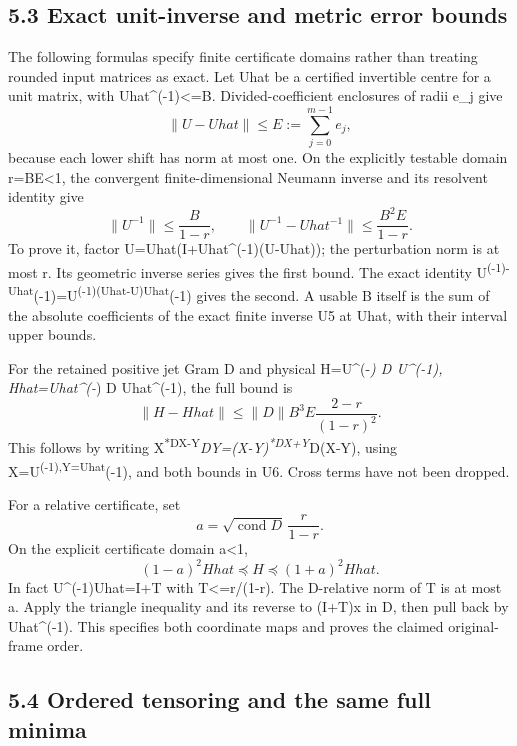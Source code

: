 \subsection{5.3 Exact unit-inverse and metric error bounds}\label{exact-unit-inverse-and-metric-error-bounds}

The following formulas specify finite certificate domains rather than treating rounded input matrices as exact. Let Uhat be a certified invertible centre for a unit matrix, with \textbar\textbar Uhat\^{}(-1)\textbar\textbar\textless=B. Divided-coefficient enclosures of radii e\_j give \[
 \|U-Uhat\|\le E:=\sum_{j=0}^{m-1}e_j,
\] because each lower shift has norm at most one. On the explicitly testable domain r=BE\textless1, the convergent finite-dimensional Neumann inverse and its resolvent identity give \[
 \boxed{\|U^{-1}\|\le\frac{B}{1-r},\qquad
 \|U^{-1}-Uhat^{-1}\|\le\frac{B^2E}{1-r}.}\tag{U6}
\] To prove it, factor U=Uhat(I+Uhat\^{}(-1)(U-Uhat)); the perturbation norm is at most r. Its geometric inverse series gives the first bound. The exact identity U\textsuperscript{(-1)-Uhat}(-1)=U\textsuperscript{(-1)(Uhat-U)Uhat}(-1) gives the second. A usable B itself is the sum of the absolute coefficients of the exact finite inverse U5 at Uhat, with their interval upper bounds.

For the retained positive jet Gram D and physical H=U\^{}(-\emph{) D U\^{}(-1), Hhat=Uhat\^{}(-}) D Uhat\^{}(-1), the full bound is \[
 \boxed{\|H-Hhat\|
 \le\|D\|B^3E\frac{2-r}{(1-r)^2}.}\tag{U7}
\] This follows by writing X\textsuperscript{*DX-Y}\emph{DY=(X-Y)\textsuperscript{*DX+Y}}D(X-Y), using X=U\textsuperscript{(-1),Y=Uhat}(-1), and both bounds in U6. Cross terms have not been dropped.

For a relative certificate, set \[
 a=\sqrt{\operatorname{cond}D}\,\frac{r}{1-r}.
\] On the explicit certificate domain a\textless1, \[
 \boxed{(1-a)^2Hhat\preceq H\preceq(1+a)^2Hhat.}\tag{U8}
\] In fact U\^{}(-1)Uhat=I+T with \textbar\textbar T\textbar\textbar\textless=r/(1-r). The D-relative norm of T is at most a. Apply the triangle inequality and its reverse to (I+T)x in D, then pull back by Uhat\^{}(-1). This specifies both coordinate maps and proves the claimed original-frame order.

\subsection{5.4 Ordered tensoring and the same full minima}\label{ordered-tensoring-and-the-same-full-minima}

